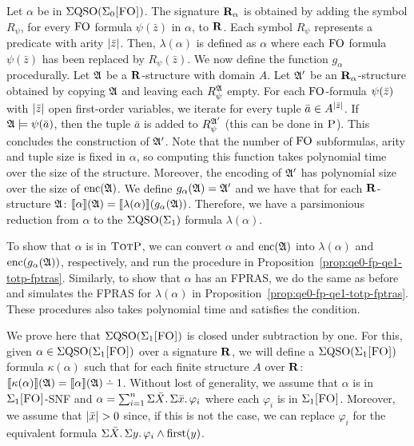 Let $\alpha$ be in $\Sigma{\rm QSO}(\Sigma_{0}\textsc{[FO]})$. The signature $\mathbf{R}_{\alpha}$ is obtained by adding the symbol $R_{\psi}$, for every ${\rm FO}$ formula $\psi(\bar{z})$ in $\alpha$, to $\mathbf{R}$. Each symbol $R_{\psi}$ represents a predicate with arity $\vert \bar{z} \vert$. Then, $\lambda(\alpha)$ is defined as $\alpha$ where each ${\rm FO}$ formula $\psi(\bar{z})$ has been replaced by $R_{\psi}(\bar{z})$. We now define the function $g_{\alpha}$ procedurally. Let $\mathfrak{A}$ be a $\mathbf{R}$-structure with domain $A$. Let $\mathfrak{A}'$ be an $\mathbf{R}_{\alpha}$-structure obtained by copying $\mathfrak{A}$ and leaving each $R_{\psi}^{\mathfrak{A}}$ empty. For each ${\rm FO}$-formula $\psi(\bar{z})$ with $\vert \bar{z} \vert$ open first-order variables, we iterate for every tuple $\bar{a} \in A^{\vert \bar{z} \vert}$. If $\mathfrak{A}\models\psi(\bar{a})$, then the tuple $\bar{a}$ is added to $R_{\psi}^{\mathfrak{A}'}$ (this can be done in $\text{\sc P}$). This concludes the construction of $\mathfrak{A}'$. Note that the number of ${\rm FO}$ subformulas, arity and tuple size is fixed in $\alpha$, so computing this function takes polynomial time over the size of the structure. Moreover, the encoding of $\mathfrak{A}'$ has polynomial size over the size of ${\rm enc}(\mathfrak{A})$. We define $g_{\alpha}(\mathfrak{A}) = \mathfrak{A}'$ and we have that for each $\mathbf{R}$-structure $\mathfrak{A}$: ${\llbracket{}{\alpha}\rrbracket}(\mathfrak{A}) = {\llbracket{}{\lambda(\alpha)}\rrbracket}(g_{\alpha}(\mathfrak{A}))$. Therefore, we have a parsimonious reduction from $\alpha$ to the $\Sigma{\rm QSO}(\Sigma_{1})$ formula $\lambda(\alpha)$.

To show that $\alpha$ is in $\text{\sc TotP}$, we can convert $\alpha$ and ${\rm enc}(\mathfrak{A})$ into $\lambda(\alpha)$ and ${\rm enc}(g_{\alpha}(\mathfrak{A}))$, respectively, and run the procedure in Proposition~\ref{prop:qe0-fp-qe1-totp-fptras}. Similarly, to show that $\alpha$ has an FPRAS, we do the same as before and simulates the FPRAS for $\lambda(\alpha)$ in Proposition~\ref{prop:qe0-fp-qe1-totp-fptras}. These procedures also takes polynomial time and satisfies the condition.

\vspace{1em}
 We prove here that $\Sigma{\rm QSO}(\Sigma_{1}\textsc{[FO]})$ is closed under subtraction by one. 
For this, given $\alpha \in \Sigma{\rm QSO}(\Sigma_{1}\textsc{[FO]})$ over a signature $\mathbf{R}$, we will define a $\Sigma{\rm QSO}(\Sigma_{1}\textsc{[FO]})$ formula $\kappa(\alpha)$ such that for each finite structure $A$ over $\mathbf{R}$: $\sem{\kappa(\alpha)}(\A) = \sem{\alpha}(\A) \dotminus 1$. 
Without lost of generality, we assume that $\alpha$ is in $\Sigma_{1}\textsc{[FO]}$-SNF and $\alpha = \sum_{i = 1}^{n}\Sigma{\bar{X}}.\,\Sigma{\bar{x}}.\,\varphi_i$ where each $\varphi_i$ is in $\Sigma_{1}\textsc{[FO]}$. Moreover, we assume that $\vert \bar{x} \vert > 0$  since, if this is not the case, we can replace $\varphi_i$ for the equivalent formula $\Sigma{\bar{X}}.\, \Sigma{y}.\, \varphi_i \wedge\operatorname{first}(y)$.

